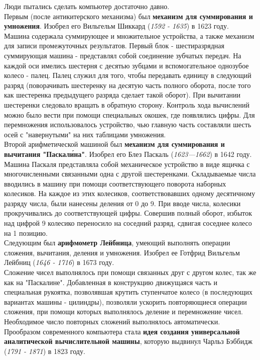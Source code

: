 Люди пытались сделать компьютер достаточно давно.
\\Первым (после антикитерского механизма) был \textbf{механизм для суммирования и умножения}. Изобрел его Вильгельм Шиккард (\emph{1592 - 1635}) в 1623 году.
\\Машина содержала суммирующее и множительное устройства, а также механизм для записи промежуточных результатов. Первый блок - шестиразрядная суммирующая машина - представлял собой соединение зубчатых передач. На каждой оси имелись шестерня с десятью зубцами и вспомогательное однозубое колесо - палец. Палец служил для того, чтобы передавать единицу в следующий разряд (поворачивать шестеренку на десятую часть полного оборота, после того как шестеренка предыдущего разряда сделает такой оборот). При вычитании шестеренки следовало вращать в обратную сторону. Контроль хода вычислений можно было вести при помощи специальных окошек, где появлялись цифры. Для перемножения использовалось устройство, чью главную часть составляли шесть осей с "навернутыми" на них таблицами умножения.
\\Второй арифметической машиной был \textbf{механизм для суммирования и вычитания "Паскал\'ина"}. Изобрел его Блез Паскаль (\emph{1623—1662}) в 1642 году.
\\Машина Паскаля представляла собой механическое устройство в виде ящичка с многочисленными связанными одна с другой шестеренками. Складываемые числа вводились в машину при помощи соответствующего поворота наборных колесиков. На каждое из этих колесиков, соответствовавших одному десятичному разряду числа, были нанесены деления от 0 до 9. При вводе числа, колесики прокручивались до соответствующей цифры. Совершив полный оборот, избыток над цифрой 9 колесико переносило на соседний разряд, сдвигая соседнее колесо на 1 позицию.
\\Следующим был \textbf{арифмометр Лейбница}, умеющий выполнять операции сложения, вычитания, деления и умножения. Изобрел ее Готфрид Вильгельм Лейбниц (\emph{1646 - 1716}) в 1673 году.
\\Сложение чисел выполнялось при помощи связанных друг с другом колес, так же как на "Паскалине". Добавленная в конструкцию движущаяся часть и специальная рукоятка, позволявшая крутить ступенчатое колесо (в последующих вариантах машины - цилиндры), позволяли ускорить повторяющиеся операции сложения, при помощи которых выполнялось деление и перемножение чисел. Необходимое число повторных сложений выполнялось автоматически.
\\Прообразом современного компьютера стала \textbf{идея создания универсальной аналитической вычислительной машины}, которую выдвинул Чарльз Бэббидж (\emph{1791 - 1871}) в 1823 году.
